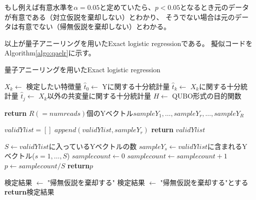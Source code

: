 \documentclass[12pt, dvipdfmx]{jmaster}
\theoremstyle{definition}
\begin{document}
もし例えば有意水準を$α=0.05$と定めていたら、$p < 0.05$となるとき元のデータが有意である（対立仮説を棄却しない）とわかり、
そうでない場合は元のデータは有意でない（帰無仮説を棄却しない）とわかる。

以上が量子アニーリングを用いたExact logistic regressionである。
擬似コードをAlgorithm\ref{algo:qaelr}に示す。

{\scriptsize
	\begin{algorithm}
		\caption{量子アニーリングを用いたExact logistic regression}
		\label{algo:qaelr}
		\begin{algorithmic}
			\State $X_k \leftarrow$ 検定したい特徴量
			\State $\hat{t}_0 \leftarrow$ Yに関する十分統計量
			\State $\hat{t}_k \leftarrow$ $X_k$に関する十分統計量
			\State $\hat{t}_j \leftarrow$ $X_k$以外の共変量に関する十分統計量
			\State $H \leftarrow$ QUBO形式の目的関数
			
			\State \textbf{return} $R(=numreads)$個のYベクトル$sampleY_1, \dots, sampleY_r, \dots, sampleY_R$
			\EndProcedure
			
			\State $validYlist= []$
			\State $append(validYlist, sampleY_r)$
			\EndIf
			\EndIf
			\EndFor
			\State \textbf{return} $validYlist$
			\EndProcedure
			
			\newpage
			\State $S  \leftarrow validYlist$に入っているYベクトルの数
			\State $sampleY_s \leftarrow validYlist$に含まれるYベクトル($s= 1, \dots , S$)
			\State $samplecount \leftarrow 0$
			\State $samplecount \leftarrow  samplecount + 1$
			\EndIf
			\EndFor
			\State $p \leftarrow samplecount/S$
			\State \textbf{return}$p$
			\EndProcedure
			
			\State 検定結果 $\leftarrow$ "帰無仮説を棄却する"
			\Else
			\State 検定結果 $\leftarrow$ "帰無仮説を棄却する"とする
			\EndIf
			\State \textbf{return}検定結果
			\EndProcedure
		\end{algorithmic} 
	\end{algorithm}
}
\end{document}
